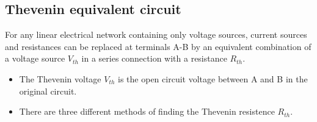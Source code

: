 \documentclass{article}
\begin{document}
\subsection{Thevenin equivalent circuit}
\begin{theorem}
    For any linear electrical network containing only voltage sources, current sources and resistances can be replaced at terminals A-B by an equivalent combination of a voltage source $V_{th}$ in a series connection with a resistance $R_{th}$.
\end{theorem}
\begin{itemize}
    \item The Thevenin voltage $V_{th}$ is the open circuit voltage between A and B in the original circuit.
    \item There are three different methods of finding the Thevenin resistence $R_{th}$.
\end{itemize}
\end{document}
